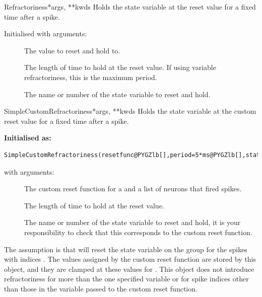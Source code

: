 \documentclass[letterpaper,10pt,english]{manual}
\begin{document}
\hypertarget{brian.Refractoriness}{}\begin{classdesc}{Refractoriness}{*args, **kwds}
Holds the state variable at the reset value for a fixed time after a spike.

Initialised with arguments:
\begin{description}
\item[] \leavevmode
The value to reset and hold to.

\item[] \leavevmode
The length of time to hold at the reset value. If using variable
refractoriness, this is the maximum period.

\item[] \leavevmode
The name or number of the state variable to reset and hold.

\end{description}
\end{classdesc}

\hypertarget{brian.SimpleCustomRefractoriness}{}\begin{classdesc}{SimpleCustomRefractoriness}{*args, **kwds}
Holds the state variable at the custom reset value for a fixed time after a spike.

\textbf{Initialised as:}

\begin{Verbatim}[commandchars=@\[\]]
SimpleCustomRefractoriness(resetfunc@PYGZlb[],period=5*ms@PYGZlb[],state=0@PYGZrb[]@PYGZrb[])
\end{Verbatim}

with arguments:
\begin{description}
\item[] \leavevmode
The custom reset function  for  a
\hyperlink{brian.NeuronGroup}{} and  a list of neurons that
fired spikes.

\item[] \leavevmode
The length of time to hold at the reset value.

\item[] \leavevmode
The name or number of the state variable to reset and hold,
it is your responsibility to check that this corresponds to
the custom reset function.

\end{description}

The assumption is that  will reset the state
variable  on the group  for the spikes with indices
. The values assigned by the custom reset function are
stored by this object, and they are clamped at these values for
. This object does not introduce refractoriness for more
than the one specified variable  or for spike indices
other than those in the variable  passed to the custom
reset function.
\end{classdesc}
\end{document}
